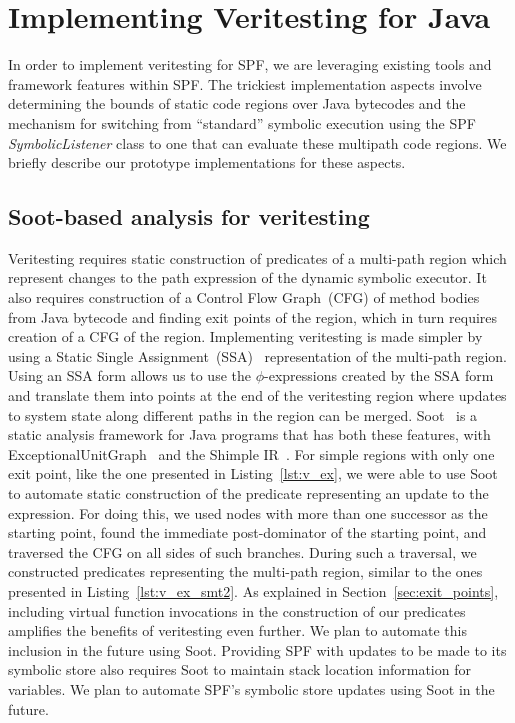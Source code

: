 \section{Implementing Veritesting for Java}
In order to implement veritesting for SPF, we are leveraging existing tools and framework features within SPF.  The trickiest implementation aspects involve determining the bounds of static code regions over Java bytecodes and the mechanism for switching from ``standard'' symbolic execution using the SPF {\em SymbolicListener} class to one that can evaluate these multipath code regions. We briefly describe our prototype implementations for these aspects.
%
\subsection{Soot-based analysis for veritesting}
%
Veritesting requires static construction of
predicates of a multi-path region which represent changes to the path expression of the dynamic
symbolic executor.
%
It also requires construction of a Control Flow Graph~(CFG) of method bodies
from Java bytecode and finding exit points of the region, which in turn
requires creation of a CFG of the region.
%
Implementing veritesting is made simpler by using a Static Single
Assignment~(SSA)~\cite{ssa} representation of the multi-path region.
%
Using an SSA form allows us to use the $\phi$-expressions created by the
SSA form and translate them into points at the end of the veritesting
region where updates to system state along different paths in the region
can be merged.
%
Soot~\cite{soot} is a static analysis framework for Java programs that
has both these features, with
ExceptionalUnitGraph~\cite{exceptionalunitgraph} and the Shimple
IR~\cite{shimple}.
%
For simple regions with only one exit point, like the one presented in Listing~\ref{lst:v_ex}, we
were able to use Soot to automate static construction of the predicate representing
an update to the expression.
%
For doing this, we used nodes with more than one successor as the
starting point, found the immediate post-dominator of the starting
point, and traversed the CFG on all sides of such branches.
%
During such a traversal, we constructed predicates representing the
multi-path region, similar to the ones presented in
Listing~\ref{lst:v_ex_smt2}.
%
As explained in Section~\ref{sec:exit_points}, including virtual
function invocations in the construction of our predicates amplifies the
benefits of veritesting even further.
%
We plan to automate this inclusion in the future using Soot.
%
Providing SPF with updates to be made to its symbolic store also
requires Soot to maintain stack location information for variables.
%
We plan to automate SPF\rq s symbolic store updates using Soot in the
future.
%
